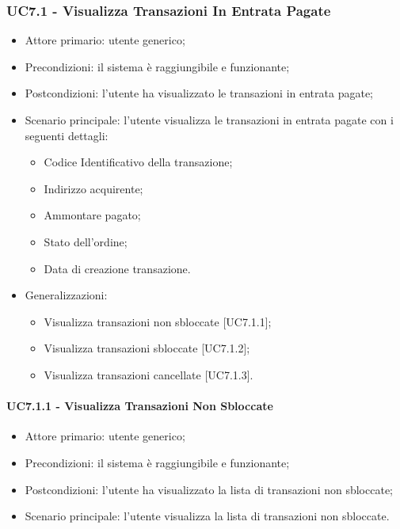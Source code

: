 \subsubsection{UC7.1 - Visualizza Transazioni In Entrata Pagate}

\begin{itemize}
    \item Attore primario: utente generico;
    \item Precondizioni: il sistema è raggiungibile e funzionante;
    \item Postcondizioni: l'utente ha visualizzato le transazioni in entrata pagate;
    \item Scenario principale: l'utente visualizza le transazioni in entrata pagate con i seguenti dettagli:
        \begin{itemize}
            \item Codice Identificativo della transazione;
            \item Indirizzo acquirente;
            \item Ammontare pagato;
            \item Stato dell'ordine;
            \item Data di creazione transazione.
        \end{itemize}
    \item Generalizzazioni:
          \begin{itemize}
              \item Visualizza transazioni non sbloccate [UC7.1.1];
              \item Visualizza transazioni sbloccate [UC7.1.2];
              \item Visualizza transazioni cancellate [UC7.1.3].
          \end{itemize}
\end{itemize}

\paragraph{UC7.1.1 - Visualizza Transazioni Non Sbloccate}

\begin{itemize}
    \item Attore primario: utente generico;
    \item Precondizioni: il sistema è raggiungibile e funzionante;
    \item Postcondizioni: l'utente ha visualizzato la lista di transazioni non sbloccate;
    \item Scenario principale: l'utente visualizza la lista di transazioni non sbloccate.
\end{itemize}

